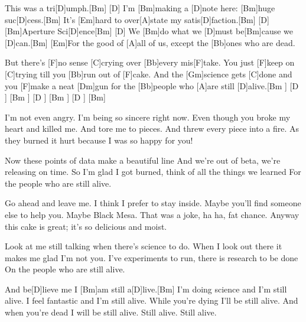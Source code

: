 

\begin{guitar}
	This was a tri[D]umph.[Bm]{}
	[D] I'm [Bm]making a [D]note here: [Bm]huge suc[D]cess.[Bm]{}
	It's [Em]hard to over[A]state my satis[D]faction.[Bm]{}
	[D] [Bm]Aperture Sci[D]ence[Bm]{}
	[D] We [Bm]do what we [D]must be[Bm]cause we [D]can.[Bm]{}
	[Em]For the good of [A]all of us, except the [Bb]ones who are dead.
	
	But there's [F]no sense [C]crying over [Bb]every mis[F]take.
	You just [F]keep on [C]trying till you [Bb]run out of [F]cake.
	And the [Gm]science gets [C]done and you [F]make a neat [Dm]gun
	for the [Bb]people who [A]are still [D]alive.[Bm ] [D ] [Bm ] [D ] [Bm ] [D ] [Bm]{}
	
	I'm not even angry.
	I'm being so sincere right now.
	Even though you broke my heart and killed me.
	And tore me to pieces.
	And threw every piece into a fire.
	As they burned it hurt because I was so happy for you!
	
	Now these points of data make a beautiful line
	And we're out of beta, we're releasing on time.
	So I'm glad I got burned, think of all the things we learned
	For the people who are still alive.
	
	Go ahead and leave me.
	I think I prefer to stay inside.
	Maybe you'll find someone else to help you.
	Maybe Black Mesa.
	That was a joke, ha ha, fat chance.
	Anyway this cake is great; it's so delicious and moist.
	
	Look at me still talking when there's science to do.
	When I look out there it makes me glad I'm not you.
	I've experiments to run, there is research to be done
	On the people who are still alive.
	
	And be[D]lieve me I [Bm]am still a[D]live.[Bm]{}	
	I'm doing science and I'm still alive.
	I feel fantastic and I'm still alive.
	While you're dying I'll be still alive.
	And when you're dead I will be still alive.
	Still alive. Still alive.
	
\end{guitar}